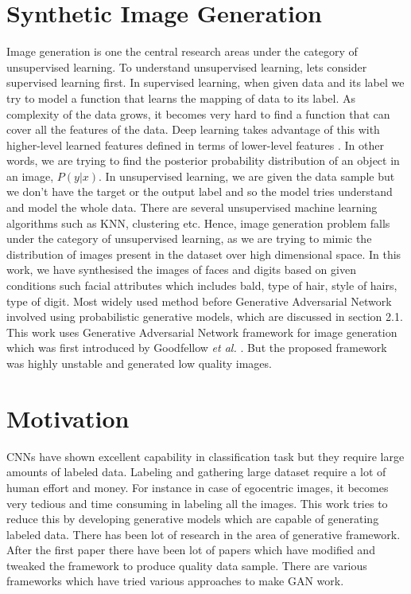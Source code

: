 \section{Synthetic Image Generation}
Image generation is one the central research areas under the category of unsupervised learning. To understand unsupervised learning, lets consider supervised learning first. In supervised learning, when given data and its label we try to model a function that learns the mapping of data to its label. As complexity of the data grows, it becomes very hard to find a function that can cover all the features of the data. Deep learning takes advantage of this with higher-level learned
features defined in terms of lower-level features \cite{bengio2012deep}. In other words, we are trying to find the posterior probability distribution of an object in an image, $P(y|x)$.
In unsupervised learning, we are given the data sample but we don't have the target or the output label and so the model tries understand and model the whole data. There are several unsupervised machine learning algorithms such as KNN, clustering etc. Hence, image generation problem falls under the category of unsupervised learning, as we are trying to mimic the distribution of images present in the dataset over high dimensional space. In this work, we have synthesised the images of faces and digits based on  given conditions  such facial attributes which includes bald, type of hair, style of hairs, type of digit. Most widely used method before Generative Adversarial Network involved using probabilistic generative models, which are discussed in section 2.1. This work uses Generative Adversarial Network framework for image generation which was first introduced by Goodfellow \textit{et al.} \cite{Original-GAN}. But the proposed  framework was highly unstable and generated low quality images. 

\section{Motivation}


CNNs have shown excellent capability in classification task \cite{CNN-Better} but they require large amounts of labeled data. Labeling and gathering large dataset require a lot of human effort and money. For instance in case of egocentric images, it becomes very tedious and time consuming in labeling all the images. This work tries to reduce this by developing generative models which are capable of generating labeled data.
There has been lot of research  in the area of generative framework. After the first paper there have been lot of papers which have modified and tweaked the framework to produce quality data sample. There are various frameworks which have tried various approaches to make GAN work. 


